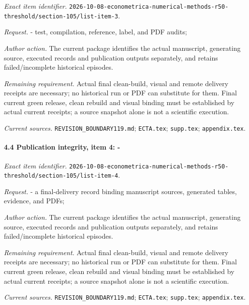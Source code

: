 \emph{Exact item identifier.} \nolinkurl{2026-10-08-econometrica-numerical-methods-r50-threshold/section-105/list-item-3}.

\par\emph{Request.} - test, compilation, reference, label, and PDF audits;

\par\emph{Author action.} The current package identifies the actual manuscript, generating source, executed records and publication outputs separately, and retains failed/\allowbreak{}incomplete historical episodes.

\par\emph{Remaining requirement.} Actual final clean-build, visual and remote delivery receipts are necessary; no historical run or PDF can substitute for them. Final current green release, clean rebuild and visual binding must be established by actual current receipts; a source snapshot alone is not a scientific execution.

\par\emph{Current sources.} \nolinkurl{REVISION_BOUNDARY119.md}; \nolinkurl{ECTA.tex}; \nolinkurl{supp.tex}; \nolinkurl{appendix.tex}.

\paragraph{4.4 Publication integrity, item 4: -}

\emph{Exact item identifier.} \nolinkurl{2026-10-08-econometrica-numerical-methods-r50-threshold/section-105/list-item-4}.

\par\emph{Request.} - a final-delivery record binding manuscript sources, generated tables, evidence, and PDFs;

\par\emph{Author action.} The current package identifies the actual manuscript, generating source, executed records and publication outputs separately, and retains failed/\allowbreak{}incomplete historical episodes.

\par\emph{Remaining requirement.} Actual final clean-build, visual and remote delivery receipts are necessary; no historical run or PDF can substitute for them. Final current green release, clean rebuild and visual binding must be established by actual current receipts; a source snapshot alone is not a scientific execution.

\par\emph{Current sources.} \nolinkurl{REVISION_BOUNDARY119.md}; \nolinkurl{ECTA.tex}; \nolinkurl{supp.tex}; \nolinkurl{appendix.tex}.

